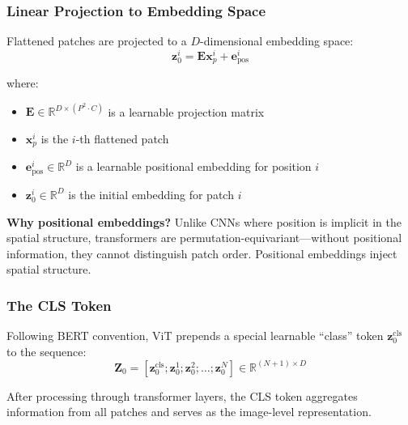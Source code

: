 \subsubsection{Linear Projection to Embedding Space}

Flattened patches are projected to a $D$-dimensional embedding space:
\begin{equation}
\mathbf{z}_0^i = \mathbf{E} \mathbf{x}_p^i + \mathbf{e}_{\text{pos}}^i
\label{eq:patch_embed}
\end{equation}

where:
\begin{itemize}
    \item $\mathbf{E} \in \mathbb{R}^{D \times (P^2 \cdot C)}$ is a learnable projection matrix
    \item $\mathbf{x}_p^i$ is the $i$-th flattened patch
    \item $\mathbf{e}_{\text{pos}}^i \in \mathbb{R}^D$ is a learnable positional embedding for position $i$
    \item $\mathbf{z}_0^i \in \mathbb{R}^D$ is the initial embedding for patch $i$
\end{itemize}

\textbf{Why positional embeddings?} Unlike CNNs where position is implicit in the spatial structure, transformers are permutation-equivariant---without positional information, they cannot distinguish patch order. Positional embeddings inject spatial structure.

\subsubsection{The CLS Token}

Following BERT convention, ViT prepends a special learnable ``class'' token $\mathbf{z}_0^{\text{cls}}$ to the sequence:
\begin{equation}
\mathbf{Z}_0 = [\mathbf{z}_0^{\text{cls}}; \mathbf{z}_0^1; \mathbf{z}_0^2; \ldots; \mathbf{z}_0^N] \in \mathbb{R}^{(N+1) \times D}
\label{eq:cls_token}
\end{equation}

After processing through transformer layers, the CLS token aggregates information from all patches and serves as the image-level representation.

